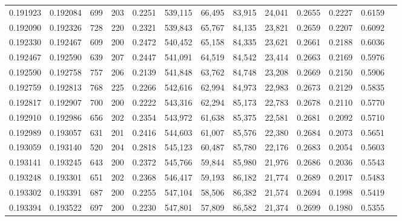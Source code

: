 \begin{tabular}{rrrrrrrrrrrrr}
0.191923 & 0.192084 &   699 & 203 &                                     0.2251 & 539,115 &  66,495 &  83,915 &  24,041 & 0.2655 & 0.2227 & 0.6159 \\
0.192090 & 0.192326 &   728 & 220 &                                     0.2321 & 539,843 &  65,767 &  84,135 &  23,821 & 0.2659 & 0.2207 & 0.6092 \\
0.192330 & 0.192467 &   609 & 200 &                                     0.2472 & 540,452 &  65,158 &  84,335 &  23,621 & 0.2661 & 0.2188 & 0.6036 \\
0.192467 & 0.192590 &   639 & 207 &                                     0.2447 & 541,091 &  64,519 &  84,542 &  23,414 & 0.2663 & 0.2169 & 0.5976 \\
0.192590 & 0.192758 &   757 & 206 &                                     0.2139 & 541,848 &  63,762 &  84,748 &  23,208 & 0.2669 & 0.2150 & 0.5906 \\
0.192759 & 0.192813 &   768 & 225 &                                     0.2266 & 542,616 &  62,994 &  84,973 &  22,983 & 0.2673 & 0.2129 & 0.5835 \\
0.192817 & 0.192907 &   700 & 200 &                                     0.2222 & 543,316 &  62,294 &  85,173 &  22,783 & 0.2678 & 0.2110 & 0.5770 \\
0.192910 & 0.192986 &   656 & 202 &                                     0.2354 & 543,972 &  61,638 &  85,375 &  22,581 & 0.2681 & 0.2092 & 0.5710 \\
0.192989 & 0.193057 &   631 & 201 &                                     0.2416 & 544,603 &  61,007 &  85,576 &  22,380 & 0.2684 & 0.2073 & 0.5651 \\
0.193059 & 0.193140 &   520 & 204 &                                     0.2818 & 545,123 &  60,487 &  85,780 &  22,176 & 0.2683 & 0.2054 & 0.5603 \\
0.193141 & 0.193245 &   643 & 200 &                                     0.2372 & 545,766 &  59,844 &  85,980 &  21,976 & 0.2686 & 0.2036 & 0.5543 \\
0.193248 & 0.193301 &   651 & 202 &                                     0.2368 & 546,417 &  59,193 &  86,182 &  21,774 & 0.2689 & 0.2017 & 0.5483 \\
0.193302 & 0.193391 &   687 & 200 &                                     0.2255 & 547,104 &  58,506 &  86,382 &  21,574 & 0.2694 & 0.1998 & 0.5419 \\
0.193394 & 0.193522 &   697 & 200 &                                     0.2230 & 547,801 &  57,809 &  86,582 &  21,374 & 0.2699 & 0.1980 & 0.5355 \\

\end{tabular}
